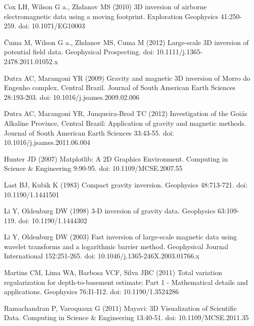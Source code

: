 \documentclass[twocolumn,final]{svjour3}
\begin{document}
\begin{thebibliography}{}

Cox LH, Wilson G a., Zhdanov MS (2010)
3D inversion of airborne electromagnetic data using a moving footprint.
Exploration Geophysics 41:250-259. doi: 10.1071/EG10003

\v{C}uma M, Wilson G a., Zhdanov MS, Cuma M (2012)
Large-scale 3D inversion of potential field data. Geophysical Prospecting.
doi: 10.1111/j.1365-2478.2011.01052.x

Dutra AC, Marangoni YR (2009)
Gravity and magnetic 3D inversion of Morro do Engenho complex, Central Brazil.
Journal of South American Earth Sciences 28:193-203.
doi: 10.1016/j.jsames.2009.02.006

Dutra AC, Marangoni YR, Junqueira-Brod TC (2012)
Investigation of the Goiás Alkaline Province, Central Brazil:
Application of gravity and magnetic methods.
Journal of South American Earth Sciences 33:43-55.
doi: 10.1016/j.jsames.2011.06.004

Hunter JD (2007)
Matplotlib: A 2D Graphics Environment. Computing in Science \& Engineering
9:90-95. doi: 10.1109/MCSE.2007.55

Last BJ, Kubik K (1983)
Compact gravity inversion. Geophysics 48:713-721. doi: 10.1190/1.1441501

Li Y, Oldenburg DW (1998)
3-D inversion of gravity data. Geophysics 63:109-119.
doi: 10.1190/1.1444302

Li Y, Oldenburg DW (2003)
Fast inversion of large-scale magnetic data using wavelet transforms and a
logarithmic barrier method. Geophysical Journal International 152:251-265.
doi: 10.1046/j.1365-246X.2003.01766.x

Martins CM, Lima WA, Barbosa VCF, Silva JBC (2011)
Total variation regularization for depth-to-basement estimate:
Part 1 - Mathematical details and applications. Geophysics 76:I1-I12.
doi: 10.1190/1.3524286

Ramachandran P, Varoquaux G (2011)
Mayavi: 3D Visualization of Scientific Data. Computing in Science \& Engineering
13:40-51. doi: 10.1109/MCSE.2011.35


\end{thebibliography}
\end{document}
